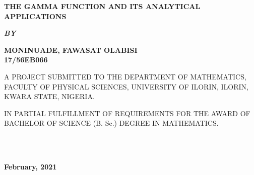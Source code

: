 \documentclass[11pt]{report}
\newcommand{\bt}[1]{\textbf{#1}}
\begin{document}
	
	\clearpage
	\thispagestyle{empty}
	\begin{center}
		\Large \bt{THE GAMMA FUNCTION AND ITS ANALYTICAL APPLICATIONS}
	\end{center}

	\hspace{7cm}
	
	\begin{center}
		\textbf{\textit{BY}}
	\end{center}
	
	\hspace{5cm}
	
	\begin{center}
		\large \textbf{MONINUADE, FAWASAT OLABISI
			\\
			17/56EB066}
	\end{center}
	
	\hspace{9cm}
	
	\begin{center}
		A PROJECT SUBMITTED TO THE DEPARTMENT OF MATHEMATICS, FACULTY OF PHYSICAL SCIENCES, UNIVERSITY OF ILORIN, ILORIN, KWARA STATE, NIGERIA.
	\end{center}

	\hspace{7cm}
	
	\begin{center}
		IN PARTIAL FULFILLMENT OF REQUIREMENTS FOR THE AWARD OF BACHELOR OF SCIENCE (B. Sc.) DEGREE IN MATHEMATICS.
	\end{center}
	\hspace{5cm}
	\\ \\ 
	\begin{center}
		\textbf{February, 2021}
	\end{center}

	\newpage
\end{document}
